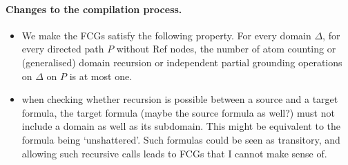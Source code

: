 \documentclass{article}
\theoremstyle{definition}
\begin{document}

\paragraph{Changes to the compilation process.}
\begin{itemize}
  \item We make the FCGs satisfy the following property. For every domain
        $\Delta$, for every directed path $P$ without Ref nodes, the number of
        atom counting or (generalised) domain recursion or independent partial
        grounding operations on $\Delta$ on $P$ is at most one.
  \item when checking whether recursion is possible between a source and a
        target formula, the target formula (maybe the source formula as well?)
        must not include a domain as well as its subdomain. This might be
        equivalent to the formula being `unshattered'. Such formulas could be
        seen as transitory, and allowing such recursive calls leads to FCGs that
        I cannot make sense of.
\end{itemize}
\end{document}
